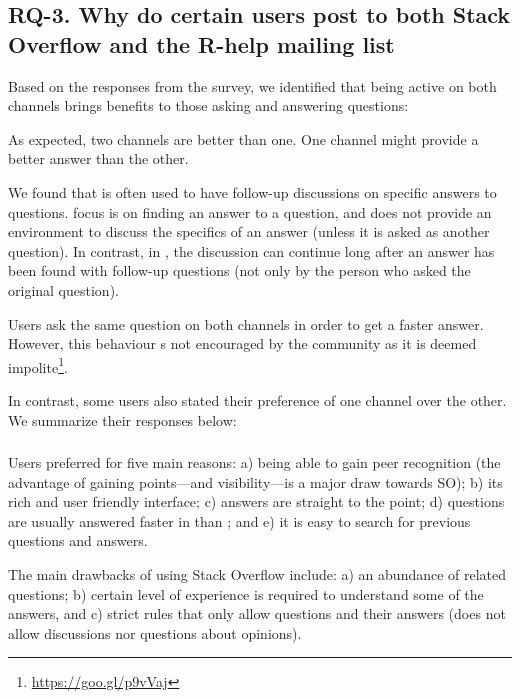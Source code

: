 \subsection{RQ-3. Why do certain users post to both Stack Overflow and the R-help mailing list}

Based on the responses from the survey, we identified that being active on both channels brings benefits to those asking and answering questions:

\begin{description}[itemsep=2pt, topsep=0pt, leftmargin=1em, parsep=0pt]
\item[Find a better answer:] As expected, two channels are better than one. 
  One channel might provide a better answer than the other.
\item[Support follow-up questions:] We found that \RH is often used to have follow-up discussions on
  specific answers to \SO questions. \SO focus is on finding an answer to a question, and does not
  provide an environment to discuss the specifics of an answer (unless it is asked as another question).
In contrast, in \RH, the discussion can continue long after an answer has been found with follow-up questions (not only by the person who asked the original question).  
\item[Speeds up answers:] Users ask the same question on both channels in order to get a faster answer. However, this behaviour s not encouraged by the community as it is deemed impolite\footnote{\href{https://goo.gl/p9vVaj}{https://goo.gl/p9vVaj}}.
\end{description}

In contrast, some users also stated their preference of one channel over the other. We summarize their responses below:
 

\subsubsection{\SO}

Users preferred \SO for five main reasons:
a) being able to gain peer recognition (the advantage of gaining points---and visibility---is a major draw towards SO);
b) its rich and user friendly interface;
c) answers are straight to the point;
d) questions are usually answered faster in \SO than \RH; and e) it is easy to search for previous questions and answers.

The main drawbacks of using Stack Overflow include: a) an abundance
    of related questions; b) certain level of experience is required to understand some of the answers, and c) \SO strict rules that only allow questions and their answers (\SO does not allow discussions nor questions about opinions).


